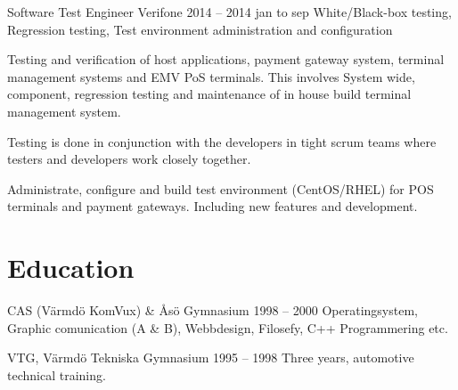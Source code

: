 \documentclass{sobCV}[2017/07/08]
\begin{document}
      \experiencenode
      {Software Test Engineer}               %
      {Verifone}                             %
      {2014 -- 2014}                         %
      {jan to sep}{                          %
         White/Black-box testing,
         Regression testing,
         Test environment administration and configuration
      }{
      Testing and verification of host applications, payment gateway system, 
      terminal management systems and EMV PoS terminals. This involves System 
      wide, component, regression testing and maintenance of in house build 
      terminal management system.

      Testing is done in conjunction with the developers in tight scrum teams 
      where testers and developers work closely together. 

      Administrate, configure and build test environment (CentOS/RHEL) for POS 
      terminals and payment gateways. Including new features and development.
      }

   \section{Education}
   \ednode
      {CAS (Värmdö KomVux) \& Åsö Gymnasium}
      {1998 -- 2000}{%
      Operatingsystem, Graphic comunication (A \& B), Webbdesign, Filosefy, C++ Programmering etc.
   }

   \ednode
      {VTG, Värmdö Tekniska Gymnasium}
      {1995 -- 1998}{%
         Three years, automotive technical training.
      }



\end{document}
